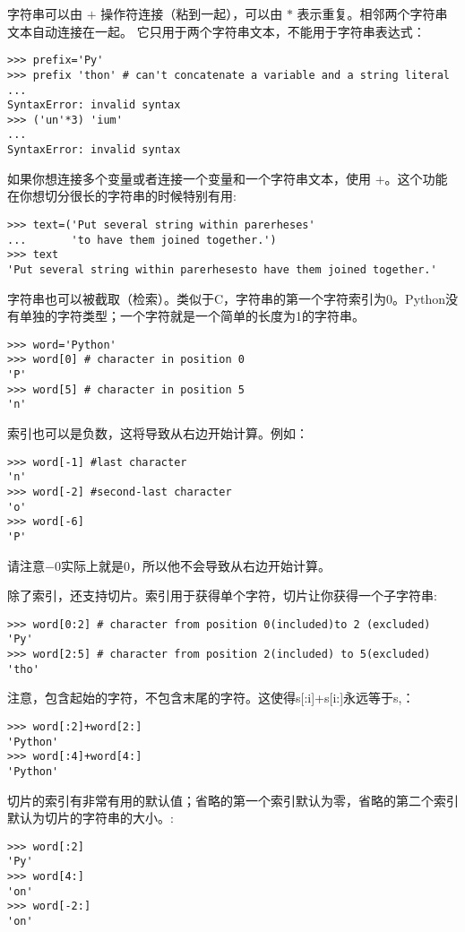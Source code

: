 \documentclass[UTF8]{ctexart}
\begin{document}
字符串可以由 $+$ 操作符连接（粘到一起），可以由 $*$ 表示重复。相邻两个字符串文本自动连接在一起。
它只用于两个字符串文本，不能用于字符串表达式：
\begin{verbatim}
>>> prefix='Py'
>>> prefix 'thon' # can't concatenate a variable and a string literal
...
SyntaxError: invalid syntax
>>> ('un'*3) 'ium'
...
SyntaxError: invalid syntax
\end{verbatim}


如果你想连接多个变量或者连接一个变量和一个字符串文本，使用 $+$。这个功能在你想切分很长的字符串的时候特别有用:
\begin{verbatim}
>>> text=('Put several string within parerheses'
...       'to have them joined together.')
>>> text
'Put several string within parerhesesto have them joined together.'
\end{verbatim}

字符串也可以被截取（检索）。类似于C，字符串的第一个字符索引为0。Python没有单独的字符类型；一个字符就是一个简单的长度为1的字符串。
\begin{verbatim}
>>> word='Python'
>>> word[0] # character in position 0
'P'
>>> word[5] # character in position 5
'n'
\end{verbatim}
索引也可以是负数，这将导致从右边开始计算。例如：
\begin{verbatim}
>>> word[-1] #last character
'n'
>>> word[-2] #second-last character
'o'
>>> word[-6]
'P'
\end{verbatim}

请注意$-0$实际上就是0，所以他不会导致从右边开始计算。

除了索引，还支持切片。索引用于获得单个字符，切片让你获得一个子字符串:
\begin{verbatim}
>>> word[0:2] # character from position 0(included)to 2 (excluded)
'Py'
>>> word[2:5] # character from position 2(included) to 5(excluded)
'tho'
\end{verbatim}

注意，包含起始的字符，不包含末尾的字符。这使得s[:i]+s[i:]永远等于s,：
\begin{verbatim}
>>> word[:2]+word[2:]
'Python'
>>> word[:4]+word[4:]
'Python'
\end{verbatim}

切片的索引有非常有用的默认值；省略的第一个索引默认为零，省略的第二个索引默认为切片的字符串的大小。:
\begin{verbatim}
>>> word[:2]
'Py'
>>> word[4:]
'on'
>>> word[-2:]
'on'
\end{verbatim}
\end{document}
